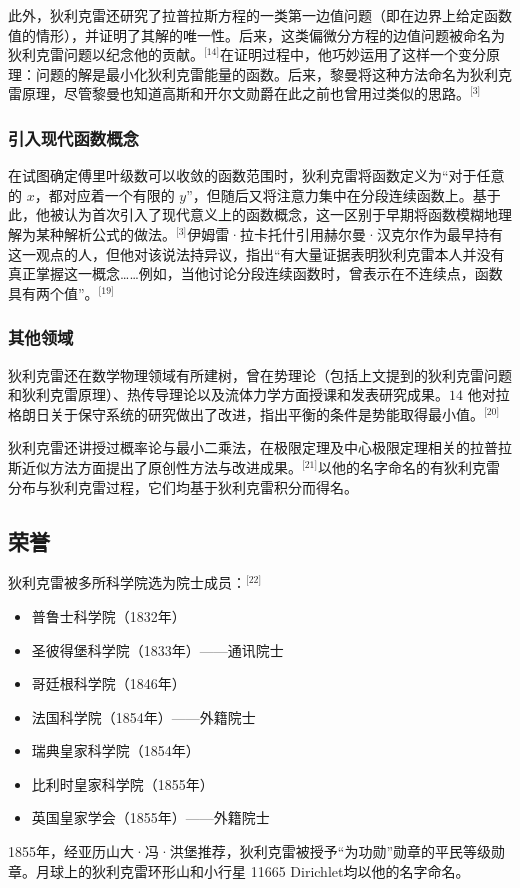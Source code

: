 此外，狄利克雷还研究了拉普拉斯方程的一类第一边值问题（即在边界上给定函数值的情形），并证明了其解的唯一性。后来，这类偏微分方程的边值问题被命名为狄利克雷问题以纪念他的贡献。\(^\text{[14]}\)在证明过程中，他巧妙运用了这样一个变分原理：问题的解是最小化狄利克雷能量的函数。后来，黎曼将这种方法命名为狄利克雷原理，尽管黎曼也知道高斯和开尔文勋爵在此之前也曾用过类似的思路。\(^\text{[3]}\)
\subsubsection{引入现代函数概念}
在试图确定傅里叶级数可以收敛的函数范围时，狄利克雷将函数定义为“对于任意的 $x$，都对应着一个有限的 $y$”，但随后又将注意力集中在分段连续函数上。基于此，他被认为首次引入了现代意义上的函数概念，这一区别于早期将函数模糊地理解为某种解析公式的做法。\(^\text{[3]}\)伊姆雷·拉卡托什引用赫尔曼·汉克尔作为最早持有这一观点的人，但他对该说法持异议，指出“有大量证据表明狄利克雷本人并没有真正掌握这一概念……例如，当他讨论分段连续函数时，曾表示在不连续点，函数具有两个值”。\(^\text{[19]}\)
\subsubsection{其他领域}
狄利克雷还在数学物理领域有所建树，曾在势理论（包括上文提到的狄利克雷问题和狄利克雷原理）、热传导理论以及流体力学方面授课和发表研究成果。$14$ 他对拉格朗日关于保守系统的研究做出了改进，指出平衡的条件是势能取得最小值。\(^\text{[20]}\)

狄利克雷还讲授过概率论与最小二乘法，在极限定理及中心极限定理相关的拉普拉斯近似方法方面提出了原创性方法与改进成果。\(^\text{[21]}\)以他的名字命名的有狄利克雷分布与狄利克雷过程，它们均基于狄利克雷积分而得名。
\subsection{荣誉}
狄利克雷被多所科学院选为院士成员：\(^\text{[22]}\)
\begin{itemize}
\item 普鲁士科学院（1832年）
\item 圣彼得堡科学院（1833年）——通讯院士
\item 哥廷根科学院（1846年）
\item 法国科学院（1854年）——外籍院士
\item 瑞典皇家科学院（1854年）
\item 比利时皇家科学院（1855年）
\item 英国皇家学会（1855年）——外籍院士
\end{itemize}
1855年，经亚历山大·冯·洪堡推荐，狄利克雷被授予“为功勋”勋章的平民等级勋章。月球上的狄利克雷环形山和小行星 11665 Dirichlet均以他的名字命名。
